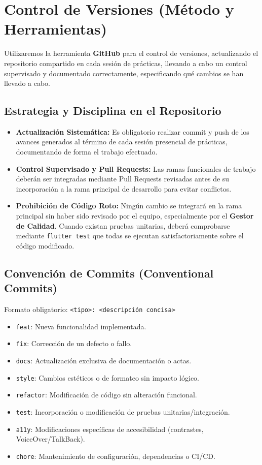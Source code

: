 \section{Control de Versiones (Método y Herramientas)}

Utilizaremos la herramienta \textbf{GitHub} para el control de versiones, actualizando el repositorio compartido en cada sesión de prácticas, llevando a cabo un control supervisado y documentado correctamente, especificando qué cambios se han llevado a cabo.

\subsection{Estrategia y Disciplina en el Repositorio}
\begin{itemize}[leftmargin=*]
  \item \textbf{Actualización Sistemática:} Es obligatorio realizar commit y push de los avances generados al término de cada sesión presencial de prácticas, documentando de forma el trabajo efectuado.
  \item \textbf{Control Supervisado y Pull Requests:} Las ramas funcionales de trabajo deberán ser integradas mediante Pull Requests revisadas antes de su incorporación a la rama principal de desarrollo para evitar conflictos.
  \item \textbf{Prohibición de Código Roto:} Ningún cambio se integrará en la rama principal sin haber sido revisado por el equipo, especialmente por el \textbf{Gestor de Calidad}. Cuando existan pruebas unitarias, deberá comprobarse mediante \texttt{flutter test} que todas se ejecutan satisfactoriamente sobre el código modificado.
\end{itemize}

\subsection{Convención de Commits (Conventional Commits)}
Formato obligatorio: \texttt{<tipo>: <descripción concisa>}
\begin{itemize}[leftmargin=*]
  \item \texttt{feat}: Nueva funcionalidad implementada.
  \item \texttt{fix}: Corrección de un defecto o fallo.
  \item \texttt{docs}: Actualización exclusiva de documentación o actas.
  \item \texttt{style}: Cambios estéticos o de formateo sin impacto lógico.
  \item \texttt{refactor}: Modificación de código sin alteración funcional.
  \item \texttt{test}: Incorporación o modificación de pruebas unitarias/integración.
  \item \texttt{a11y}: Modificaciones específicas de accesibilidad (contrastes, VoiceOver/TalkBack).
  \item \texttt{chore}: Mantenimiento de configuración, dependencias o CI/CD.
\end{itemize}
